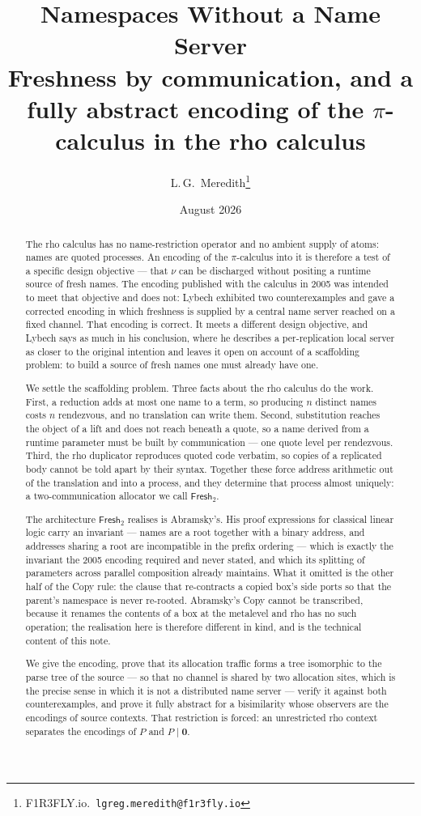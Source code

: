 \documentclass[11pt]{article}
\title{\textbf{Namespaces Without a Name Server}\\[4pt]
\large Freshness by communication, and a fully abstract encoding of the
$\pi$-calculus in the rho calculus}
\author{L.\,G.\ Meredith\thanks{F1R3FLY.io.\ \texttt{lgreg.meredith@f1r3fly.io}}}
\date{August 2026}
\theoremstyle{definition}
\theoremstyle{plain}
\theoremstyle{remark}
\newcommand{\nil}{\mathbf{0}}
\newcommand{\Frsh}{\mathsf{Fresh}_2}
\begin{document}
\maketitle

\begin{abstract}
\noindent
The rho calculus has no name-restriction operator and no ambient supply
of atoms: names are quoted processes. An encoding of the $\pi$-calculus
into it is therefore a test of a specific design objective --- that $\nu$
can be discharged without positing a runtime source of fresh names. The
encoding published with the calculus in 2005 was intended to meet that
objective and does not: Lybech exhibited two counterexamples and gave a
corrected encoding in which freshness is supplied by a central name
server reached on a fixed channel. That encoding is correct. It meets a
different design objective, and Lybech says as much in his conclusion,
where he describes a per-replication local server as closer to the
original intention and leaves it open on account of a scaffolding
problem: to build a source of fresh names one must already have one.

We settle the scaffolding problem. Three facts about the rho calculus do
the work. First, a reduction adds at most one name to a term, so
producing $n$ distinct names costs $n$ rendezvous, and no translation can
write them. Second, substitution reaches the object of a lift and does
not reach beneath a quote, so a name derived from a runtime parameter
must be built by communication --- one quote level per rendezvous.
Third, the rho duplicator reproduces quoted code verbatim, so copies of a
replicated body cannot be told apart by their syntax. Together these
force address arithmetic out of the translation and into a process, and
they determine that process almost uniquely: a two-communication
allocator we call $\Frsh$.

The architecture $\Frsh$ realises is Abramsky's. His proof expressions for
classical linear logic carry an invariant --- names are a root together
with a binary address, and addresses sharing a root are incompatible in
the prefix ordering --- which is exactly the invariant the 2005 encoding
required and never stated, and which its splitting of parameters across
parallel composition already maintains. What it omitted is the other half
of the Copy rule: the clause that re-contracts a copied box's side ports
so that the parent's namespace is never re-rooted. Abramsky's Copy cannot
be transcribed, because it renames the contents of a box at the metalevel
and rho has no such operation; the realisation here is therefore
different in kind, and is the technical content of this note.

We give the encoding, prove that its allocation traffic forms a tree
isomorphic to the parse tree of the source --- so that no channel is
shared by two allocation sites, which is the precise sense in which it is
not a distributed name server --- verify it against both counterexamples,
and prove it fully abstract for a bisimilarity whose observers are the
encodings of source contexts. That restriction is forced: an unrestricted
rho context separates the encodings of $P$ and $P \mid \nil$.
\end{abstract}
\end{document}

